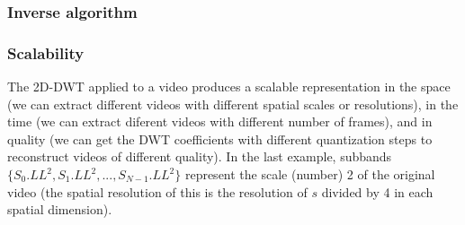 

\begin{Shaded}
\begin{Highlighting}[]
    
\OperatorTok{=}
\end{Highlighting}
\end{Shaded}

    \hypertarget{inverse-algorithm}{%
\subsubsection{Inverse algorithm}\label{inverse-algorithm}}



\begin{Shaded}
\begin{Highlighting}[]
    
\OperatorTok{=}
\end{Highlighting}
\end{Shaded}

    \hypertarget{scalability}{%
\subsubsection{Scalability}\label{scalability}}

The 2D-DWT applied to a video produces a scalable representation in the
space (we can extract different videos with different spatial scales or
resolutions), in the time (we can extract diferent videos with different
number of frames), and in quality (we can get the DWT coefficients with
different quantization steps to reconstruct videos of different
quality). In the last example, subbands
\(\{S_0.LL^2, S_1.LL^2, ..., S_{N-1}.LL^2\}\) represent the scale
(number) 2 of the original video (the spatial resolution of this is the
resolution of \(s\) divided by 4 in each spatial dimension).


